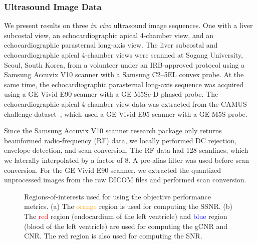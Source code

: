 \subsubsection{Ultrasound Image Data}\label{section:data}
We present results on three \textit{in vivo} ultrasound image sequences.
One with a liver subcostal view, an echocardiographic apical 4-chamber view, and an echocardiographic parasternal long-axis view.
The liver subcostal and echocardiographic apical 4-chamber views were scanned at Sogang University, Seoul, South Korea, from a volunteer under an IRB-approved protocol using a Samsung Accuvix V10 scanner with a Samsung C2--5EL convex probe. At the same time, the echocardiographic parasternal long-axis sequence was acquired using a GE Vivid E90 scanner with a GE M5Sc-D phased probe.
The echocardiographic apical 4-chamber view data was extracted from the CAMUS challenge dataset~\cite{leclerc_deep_2019}, which used a GE Vivid E95 scanner with a GE M5S probe.

Since the Samsung Accuvix V10 scanner research package only returns beamformed radio-frequency (RF) data, we locally performed DC rejection, envelope detection, and scan conversion.
The RF data had 128 scanlines, which we laterally interpolated by a factor of 8.
A pre-alias filter was used before scan conversion.
For the GE Vivid E90 scanner, we extracted the quantized unprocessed images from the raw DICOM files and performed scan conversion.

%
\begin{figure}[t]
  \centering
  \caption{Regions-of-interests used for using the objective performance metrics.
    (a) The \textcolor{orange}{orange} region is used for computing the SSNR.
    (b) The \textcolor{red}{red} region (endocardium of the left ventricle) and \textcolor{blue}{blue} region (blood of the left ventricle) are used for computing the gCNR and CNR.
    The red region is also used for computing the SNR.
  }\label{fig:roi}
\end{figure}
% 
